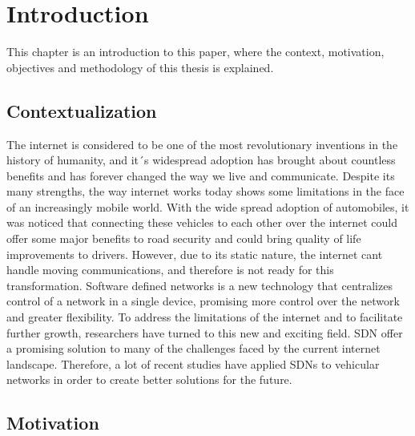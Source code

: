
%

\chapter{Introduction}
\label{cha:introduction}

This chapter is an introduction to this paper, where the context, motivation, objectives and methodology of this thesis is explained.

\section{Contextualization} %
\label{sec:contex}

The internet is considered to be one of the most revolutionary inventions in the history of humanity, and it´s widespread adoption has brought about countless benefits and has forever changed the way we live and communicate. 
Despite its many strengths, the way internet works today  shows some limitations in the face of an increasingly mobile world. With the wide spread adoption of automobiles, it was noticed that connecting these vehicles to each other over the internet could offer some major benefits to road security and could bring quality of life improvements to drivers. However, due to its static nature, the internet cant handle moving communications, and therefore is not ready for this transformation.
Software defined networks is a new technology that centralizes control of a network in a single device, promising more control over the network and greater flexibility. To address the limitations of the internet and to facilitate further growth, researchers have turned to this new and exciting field. SDN offer a promising solution to many of the challenges faced by the current internet landscape.
Therefore, a lot of recent studies have applied SDNs to vehicular networks in order to create better solutions for the future.


\section{Motivation} %
\label{sec:motivation}

